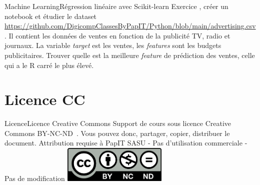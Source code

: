 \documentclass{beamer}
\begin{document}
    \begin{frame}{Machine Learning}{Régression linéaire avec Scikit-learn}
        Exercice \execcounterdispinc{}, créer un notebook et étudier le dataset \url{https://github.com/DigicompClassesByPapIT/Python/blob/main/advertising.csv}.
        Il contient les données de ventes en fonction de la publicité TV, radio et journaux.
        \bigbreak
        La variable \textit{target} est les ventes, les \textit{features} sont les budgets publicitaires.
        Trouver quelle est la meilleure \textit{feature} de prédiction des ventes, celle qui a le R carré le plus élevé.
    \end{frame}


    \section{Licence CC}\label{sec:licence}

    \begin{frame}{Licence}{Licence Creative Commons}
        Support de cours sous licence Creative Commons BY-NC-ND~.
        \bigbreak
        Vous pouvez donc, partager, copier, distribuer le document.
        \bigbreak
        Attribution requise à PapIT SASU - Pas d’utilisation commerciale - Pas de modification
        \bigbreak
        \centering
        \includegraphics[width=5cm]{image/by-nc-nd-logo}
    \end{frame}
\end{document}
